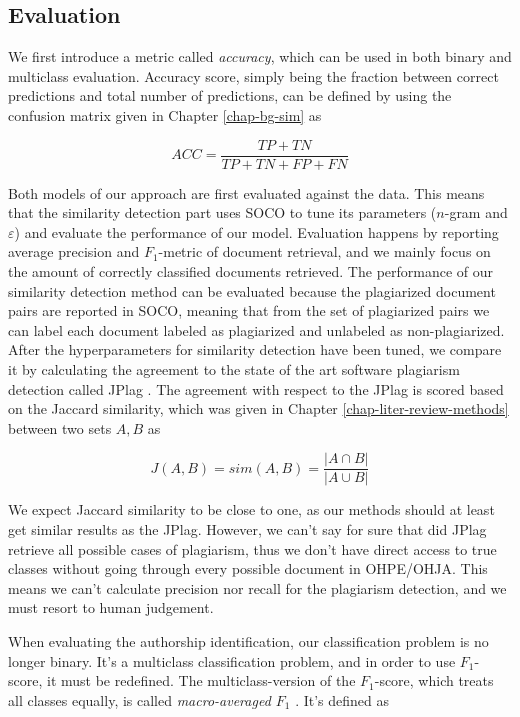 \subsection{Evaluation} \label{chap-method-evaluation}

We first introduce a metric called \emph{accuracy}, which can be used in both binary and multiclass evaluation. Accuracy score, simply being the fraction between correct predictions and total number of predictions, can be defined by using the confusion matrix given in Chapter \ref{chap-bg-sim} as

\begin{equation}
    ACC = \dfrac{TP + TN}{TP + TN + FP + FN}
\end{equation}

Both models of our approach are first evaluated against the data. This means that the similarity detection part uses SOCO to tune its parameters ($n$-gram and $\varepsilon$) and evaluate the performance of our model. Evaluation happens by reporting average precision and $F_1$-metric of document retrieval, and we mainly focus on the amount of correctly classified documents retrieved. The performance of our similarity detection method can be evaluated because the plagiarized document pairs are reported in SOCO, meaning that from the set of plagiarized pairs we can label each document labeled as plagiarized and unlabeled as non-plagiarized. After the hyperparameters for similarity detection have been tuned, we compare it by calculating the agreement to the state of the art software plagiarism detection called JPlag \cite{prechelt2002finding}. The agreement with respect to the JPlag is scored based on the Jaccard similarity, which was given in Chapter \ref{chap-liter-review-methods} between two sets $A, B$ as

\begin{equation}
    J(A,B) = sim(A,B) = \dfrac{|A \cap B|}{|A \cup B|}
\end{equation}

\noindent
We expect Jaccard similarity to be close to one, as our methods should at least get similar results as the JPlag. However, we can't say for sure that did JPlag retrieve all possible cases of plagiarism, thus we don't have direct access to true classes without going through every possible document in OHPE/OHJA. This means we can't calculate precision nor recall for the plagiarism detection, and we must resort to human judgement. 



When evaluating the authorship identification, our classification problem is no longer binary. It's a multiclass classification problem, and in order to use $F_1$-score, it must be redefined. The multiclass-version of the $F_1$-score, which treats all classes equally, is called \emph{macro-averaged $F_1$} \cite{SOKOLOVA2009427}. It's defined as 

